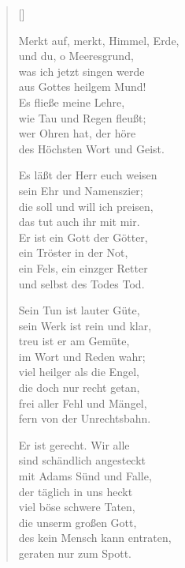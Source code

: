 \begin{multicols}{2}
\settowidth{\versewidth}{Merkt auf, merkt, Himmel, Erde,}
\begin{verse}[\versewidth]

 Merkt auf, merkt, Himmel, Erde,\\
und du, o Meeresgrund,\\
was ich jetzt singen werde\\
aus Gottes heilgem Mund!\\
Es fließe meine Lehre,\\
wie Tau und Regen fleußt;\\
wer Ohren hat, der höre\\
des Höchsten Wort und Geist.

 Es läßt der Herr euch weisen\\
sein Ehr und Namenszier;\\
die soll und will ich preisen,\\
das tut auch ihr mit mir.\\
Er ist ein Gott der Götter,\\
ein Tröster in der Not,\\
ein Fels, ein einzger Retter\\
und selbst des Todes Tod.

 Sein Tun ist lauter Güte,\\
sein Werk ist rein und klar,\\
treu ist er am Gemüte,\\
im Wort und Reden wahr;\\
viel heilger als die Engel,\\
die doch nur recht getan,\\
frei aller Fehl und Mängel,\\
fern von der Unrechtsbahn.

 Er ist gerecht. Wir alle\\
sind schändlich angesteckt\\
mit Adams Sünd und Falle,\\
der täglich in uns heckt\\
viel böse schwere Taten,\\
die unserm großen Gott,\\
des kein Mensch kann entraten,\\
geraten nur zum Spott.


\end{verse}
\end{multicols}
